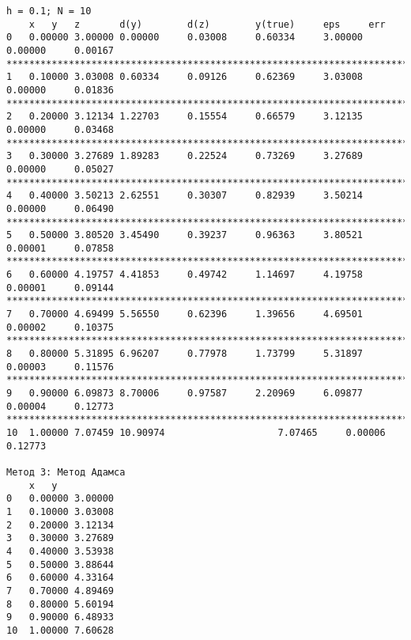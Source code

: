 \begin{verbatim}
h = 0.1; N = 10
	x	y	z		d(y)		d(z)		y(true)		eps		err
0	0.00000	3.00000	0.00000		0.03008		0.60334		3.00000		0.00000		0.00167
*************************************************************************************************
1	0.10000	3.03008	0.60334		0.09126		0.62369		3.03008		0.00000		0.01836
*************************************************************************************************
2	0.20000	3.12134	1.22703		0.15554		0.66579		3.12135		0.00000		0.03468
*************************************************************************************************
3	0.30000	3.27689	1.89283		0.22524		0.73269		3.27689		0.00000		0.05027
*************************************************************************************************
4	0.40000	3.50213	2.62551		0.30307		0.82939		3.50214		0.00000		0.06490
*************************************************************************************************
5	0.50000	3.80520	3.45490		0.39237		0.96363		3.80521		0.00001		0.07858
*************************************************************************************************
6	0.60000	4.19757	4.41853		0.49742		1.14697		4.19758		0.00001		0.09144
*************************************************************************************************
7	0.70000	4.69499	5.56550		0.62396		1.39656		4.69501		0.00002		0.10375
*************************************************************************************************
8	0.80000	5.31895	6.96207		0.77978		1.73799		5.31897		0.00003		0.11576
*************************************************************************************************
9	0.90000	6.09873	8.70006		0.97587		2.20969		6.09877		0.00004		0.12773
*************************************************************************************************
10	1.00000	7.07459	10.90974					7.07465		0.00006		0.12773

Метод 3: Метод Адамса
	x	y
0	0.00000	3.00000
1	0.10000	3.03008
2	0.20000	3.12134
3	0.30000	3.27689
4	0.40000	3.53938
5	0.50000	3.88644
6	0.60000	4.33164
7	0.70000	4.89469
8	0.80000	5.60194
9	0.90000	6.48933
10	1.00000	7.60628


\end{verbatim}

